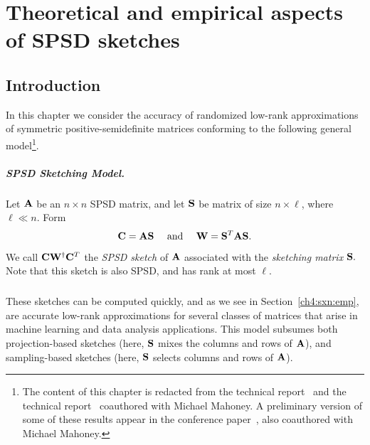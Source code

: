 
\chapter{Theoretical and empirical aspects of SPSD sketches}
\label{ch4}


\section{Introduction}

In this chapter we consider the accuracy of randomized low-rank approximations of symmetric 
positive-semidefinite matrices conforming to the following general model\footnote{The content of this chapter is redacted from
the technical report~\cite{Git12} and the technical report~\cite{GM13} coauthored with Michael Mahoney. A preliminary version of some of these results appear in
the conference paper~\cite{GM13_ICML}, also coauthored with Michael Mahoney.}.
%

\paragraph{SPSD Sketching Model.}
Let $\mathbf{A}$ be an $n \times n$ SPSD matrix, and 
let $\mathbf{S}$ be matrix of size $n \times \ell$, where $\ell \ll n$. 
Form
\[
 \mathbf{C} = \mathbf{A} \mathbf{S} \quad \text{ and } \quad \mathbf{W} = \mathbf{S}^T \mathbf{A} \mathbf{S}.
\]
We call $\mathbf{C} \mathbf{W}^\dagger \mathbf{C}^T$ the \emph{SPSD sketch} of $\mathbf{A}$ associated with the
\emph{sketching matrix} $\mathbf{S}.$ Note that this sketch is also SPSD, and has rank
at most $\ell.$

\paragraph{} These sketches can be computed quickly, and as we see in Section~\ref{ch4:sxn:emp},
are accurate low-rank approximations for several classes of matrices that arise in machine learning
and data analysis applications. This model subsumes
both projection-based sketches (here, $\mathbf{S}$ mixes the columns and rows of $\mathbf{A}$),
and sampling-based sketches (here, $\mathbf{S}$ selects columns and rows of $\mathbf{A}$).

